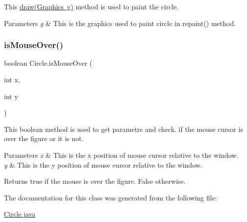 This \mbox{\hyperlink{class_circle_aeac85bfb9e1f4a2fa8f1d6c6ac2745b6}{draw(\+Graphics g)}} method is used to paint the circle. 
\begin{DoxyParams}{Parameters}
{\em g} & This is the graphics used to paint circle in repaint() method. \\
\hline
\end{DoxyParams}
\mbox{\label{class_circle_a8e13cf7320430bac26c1d64d4869b1b9}} 
\subsubsection{\texorpdfstring{isMouseOver()}{isMouseOver()}}
{\footnotesize\ttfamily boolean Circle.\+is\+Mouse\+Over (\begin{DoxyParamCaption}\item[{int}]{x,  }\item[{int}]{y }\end{DoxyParamCaption})}

This boolean method is used to get parametrs and check. if the mouse cursor is over the figure or it is not. 
\begin{DoxyParams}{Parameters}
{\em x} & This is the x position of mouse cursor relative to the window. \\
\hline
{\em y} & This is the y position of mouse cursor relative to the window. \\
\hline
\end{DoxyParams}
\begin{DoxyReturn}{Returns}
true if the mouse is over the figure. False otherwise. 
\end{DoxyReturn}


The documentation for this class was generated from the following file\+:\begin{DoxyCompactItemize}
\item 
\mbox{\hyperlink{_circle_8java}{Circle.\+java}}\end{DoxyCompactItemize}

